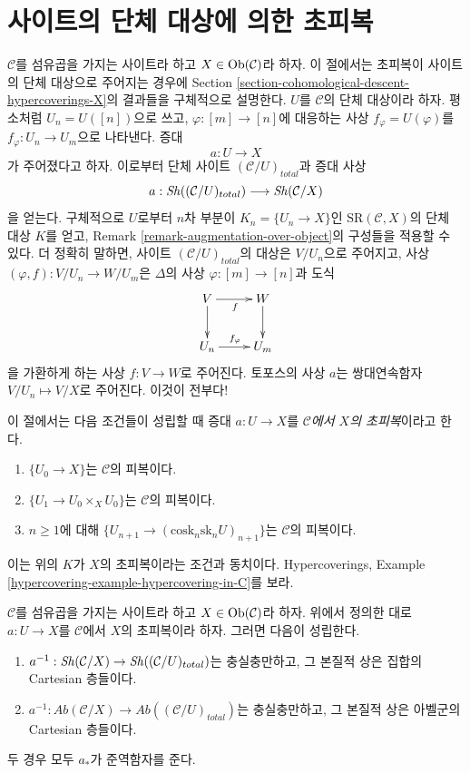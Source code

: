 \section{사이트의 단체 대상에 의한 초피복}
\label{section-hypercovering}

\noindent
$\mathcal{C}$를 섬유곱을 가지는 사이트라 하고
$X \in \mathop{\mathrm{Ob}}\nolimits(\mathcal{C})$라 하자. 이 절에서는 초피복이 사이트의 단체
대상으로 주어지는 경우에 Section
\ref{section-cohomological-descent-hypercoverings-X}의 결과들을
구체적으로 설명한다. $U$를 $\mathcal{C}$의 단체 대상이라 하자.
평소처럼 $U_n = U([n])$으로 쓰고, $\varphi : [m] \to [n]$에 대응하는
사상 $f_\varphi = U(\varphi)$를
$f_\varphi : U_n \to U_m$으로 나타낸다. 증대
$$
a : U \to X
$$
가 주어졌다고 하자. 이로부터 단체 사이트
$(\mathcal{C}/U)_{total}$과 증대 사상
$$
a : \mathop{\mathit{Sh}}\nolimits((\mathcal{C}/U)_{total}) \longrightarrow \mathop{\mathit{Sh}}\nolimits(\mathcal{C}/X)
$$
을 얻는다. 구체적으로 $U$로부터 $n$차 부분이
$K_n = \{U_n \to X\}$인 $\text{SR}(\mathcal{C}, X)$의 단체 대상
$K$를 얻고, Remark \ref{remark-augmentation-over-object}의 구성들을
적용할 수 있다.
더 정확히 말하면, 사이트 $(\mathcal{C}/U)_{total}$의 대상은
$V/U_n$으로 주어지고, 사상 $(\varphi, f) : V/U_n \to W/U_m$은
$\Delta$의 사상 $\varphi : [m] \to [n]$과 도식
$$
\xymatrix{
V \ar[r]_f \ar[d] & W \ar[d] \\
U_n \ar[r]^{f_\varphi} & U_m
}
$$
을 가환하게 하는 사상 $f : V \to W$로 주어진다. 토포스의 사상
$a$는 쌍대연속함자 $V/U_n \mapsto V/X$로 주어진다. 이것이 전부다!

\medskip\noindent
이 절에서는 다음 조건들이 성립할 때 증대 $a : U \to X$를
{\it $\mathcal{C}$에서 $X$의 초피복}이라고 한다.
\begin{enumerate}
\item $\{U_0 \to X\}$는 $\mathcal{C}$의 피복이다.
\item $\{U_1 \to U_0 \times_X U_0\}$는 $\mathcal{C}$의 피복이다.
\item $n \geq 1$에 대해
$\{U_{n + 1} \to (\text{cosk}_n\text{sk}_n U)_{n + 1}\}$는
$\mathcal{C}$의 피복이다.
\end{enumerate}
이는 위의 $K$가 $X$의 초피복이라는 조건과 동치이다.
Hypercoverings, Example
\ref{hypercovering-example-hypercovering-in-C}를 보라.

\begin{lemma}
\label{lemma-hypercovering-X-simple-descent-sheaves}
$\mathcal{C}$를 섬유곱을 가지는 사이트라 하고
$X \in \mathop{\mathrm{Ob}}\nolimits(\mathcal{C})$라 하자. 위에서 정의한 대로
$a : U \to X$를 $\mathcal{C}$에서 $X$의 초피복이라 하자.
그러면 다음이 성립한다.
\begin{enumerate}
\item $a^{-1} : \mathop{\mathit{Sh}}\nolimits(\mathcal{C}/X) \to
\mathop{\mathit{Sh}}\nolimits((\mathcal{C}/U)_{total})$는 충실충만하고, 그 본질적 상은
집합의 Cartesian 층들이다.
\item $a^{-1} : \textit{Ab}(\mathcal{C}/X) \to
\textit{Ab}((\mathcal{C}/U)_{total})$는 충실충만하고, 그 본질적 상은
아벨군의 Cartesian 층들이다.
\end{enumerate}
두 경우 모두 $a_*$가 준역함자를 준다.
\end{lemma}

